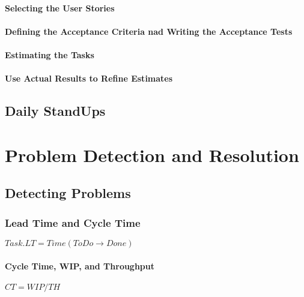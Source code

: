 \documentclass[letterpaper,10pt,english]{jupyterBook}
\begin{document}
\paragraph{Selecting the User Stories}
\label{\detokenize{APM/agile:selecting-the-user-stories}}

\paragraph{Defining the Acceptance Criteria nad Writing the Acceptance Tests}
\label{\detokenize{APM/agile:defining-the-acceptance-criteria-nad-writing-the-acceptance-tests}}

\paragraph{Estimating the Tasks}
\label{\detokenize{APM/agile:estimating-the-tasks}}

\paragraph{Use Actual Results to Refine Estimates}
\label{\detokenize{APM/agile:use-actual-results-to-refine-estimates}}

\subsection{Daily Stand\sphinxhyphen{}Ups}
\label{\detokenize{APM/agile:daily-stand-ups}}

\section{Problem Detection and Resolution}
\label{\detokenize{APM/agile:problem-detection-and-resolution}}

\subsection{Detecting Problems}
\label{\detokenize{APM/agile:detecting-problems}}

\subsubsection{Lead Time and Cycle Time}
\label{\detokenize{APM/agile:lead-time-and-cycle-time}}
\sphinxAtStartPar
\(Task.LT=Time(ToDo \rightarrow Done)\)


\paragraph{Cycle Time, WIP, and Throughput}
\label{\detokenize{APM/agile:cycle-time-wip-and-throughput}}
\sphinxAtStartPar
\(CT=WIP/TH\)
\end{document}
